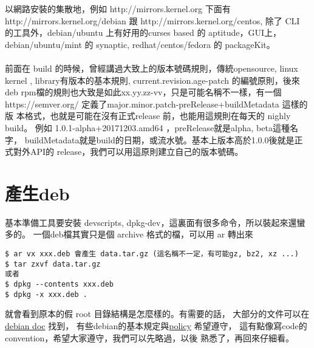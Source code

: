   以網路安裝的集散地，例如 http://mirrors.kernel.org 下面有
  http://mirrors.kernel.org/debian 跟 http://mirrors.kernel.org/centos,
  除了 CLI 的工具外，debian/ubuntu 上有好用的curses based 的 aptitude，GUI上，
  debian/ubuntu/mint 的 synaptic, redhat/centos/fedora 的 packageKit。
  \\\\
  前面在 build 的時候，曾經講過大致上的版本號碼規則，傳統opensource, linux 
  kernel , library有版本的基本規則, current.revision.age-patch 的編號原則，後來
  deb rpm檔的規則也大致是如此xx.yy.zz-vv，只是可能名稱不一樣，有一個
  https://semver.org/ 定義了major.minor.patch-preRelease+buildMetadata 這樣的版
  本格式，也就是可能在沒有正式release 前，也能用這規則在每天的 nighly build。
  例如 1.0.1-alpha+20171203.amd64 ，preRelease就是alpha, beta這種名字，
  buildMetadata就是build的日期，或流水號。基本上版本高於1.0.0後就是正式對外API的
  release，我們可以用這原則建立自己的版本號碼。

\section{產生deb}
基本準備工具要安裝 devscripts, dpkg-dev，這裏面有很多命令，所以裝起來還蠻多的。
一個deb檔其實只是個 archive 格式的檔，可以用 ar 轉出來
\begin{verbatim}
$ ar vx xxx.deb 會產生 data.tar.gz (這名稱不一定，有可能gz, bz2, xz ...)
$ tar zxvf data.tar.gz
或者
$ dpkg --contents xxx.deb
$ dpkg -x xxx.deb .
\end{verbatim}
就會看到原本的假 root 目錄結構是怎麼樣的。有需要的話，
大部分的文件可以在\href{https://www.debian.org/doc/}{debian doc} 找到，
有些debian的基本規定與\href{https://www.debian.org/doc/debian-policy/}{policy}
希望遵守， 這有點像寫code的convention，希望大家遵守，我們可以先略過，以後
熟悉了，再回來仔細看。

